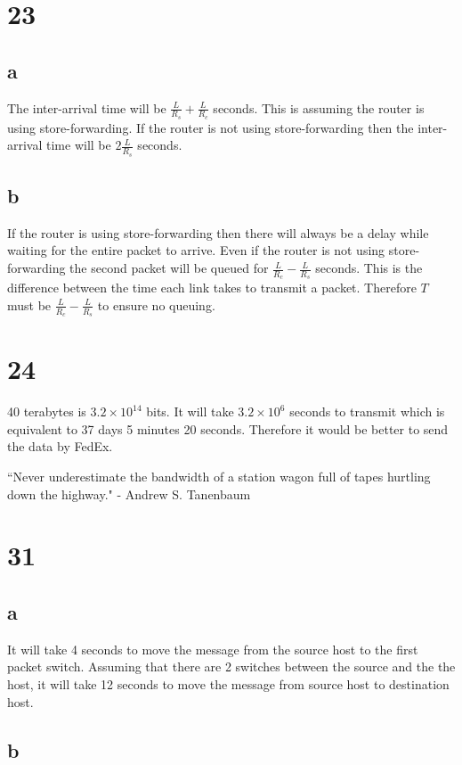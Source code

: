 \documentclass[12pt,letterpaper]{article}
\begin{document}
\section*{23}
\subsection*{a}

The inter-arrival time will be $\frac{L}{R_s}+\frac{L}{R_c}$ seconds.
This is assuming the router is using store-forwarding.
If the router is not using store-forwarding then the inter-arrival time will be $2\frac{L}{R_s}$ seconds.
\subsection*{b}

If the router is using store-forwarding then there will always be a delay while waiting for the entire packet to arrive. Even if the router is not using store-forwarding the second packet will be queued for $\frac{L}{R_c}-\frac{L}{R_s}$ seconds.
This is the difference between the time each link takes to transmit a packet.
Therefore $T$ must be $\frac{L}{R_c}-\frac{L}{R_s}$ to ensure no queuing.
\section*{24}
40 terabytes is $3.2\times10^{14}$ bits.
It will take $3.2\times10^6$ seconds to transmit which is equivalent to 37 days 5 minutes 20 seconds.
Therefore it would be better to send the data by FedEx.

``Never underestimate the bandwidth of a station wagon full of tapes hurtling down the highway." - Andrew S. Tanenbaum

\section*{31}
\subsection*{a}

It will take 4 seconds to move the message from the source host to the first packet switch.
Assuming that there are 2 switches between the source and the the host, it will take 12 seconds to move the message from source host to destination host.
\subsection*{b}
\end{document}
